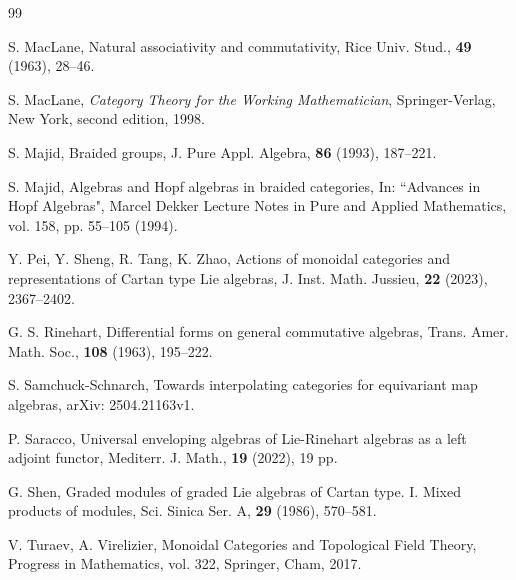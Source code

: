 \documentclass[11pt]{amsart}
\newcommand{\bbC}{\mathbb{C}}
\theoremstyle{definition}
\numberwithin{equation}{section}
\begin{document}
\begin{thebibliography}{99}
	
	
	 S. MacLane, Natural associativity and commutativity, Rice Univ. Stud., {\bf 49} (1963), 28--46.
	
	 S. MacLane,  \textit{Category Theory for the Working Mathematician},  Springer-Verlag, New York, second edition, 1998.
	
	 S. Majid, Braided groups, J. Pure Appl. Algebra, {\bf 86} (1993), 187--221.
	
	 S. Majid, Algebras and Hopf algebras in braided categories, In: ``Advances in Hopf Algebras", Marcel Dekker Lecture Notes in Pure and Applied Mathematics, vol. 158, pp. 55--105 (1994).
	
	 Y. Pei,  Y.  Sheng,  R. Tang, K.  Zhao,  Actions of monoidal categories and representations of Cartan type Lie algebras, 
	J. Inst. Math. Jussieu, {\bf 22}  (2023),  2367--2402.
	
	 G. S. Rinehart, Differential forms on general commutative algebras, Trans. Amer. Math. Soc., {\bf 108} (1963), 195--222.
	
	 S. Samchuck-Schnarch, Towards interpolating categories for equivariant map algebras, arXiv: 2504.21163v1. 
	
	 P. Saracco, Universal enveloping algebras of Lie-Rinehart algebras as a left adjoint functor, Mediterr. J. Math., {\bf 19} (2022), 19 pp. 
	
	 G. Shen, Graded modules of graded Lie algebras of Cartan type. I. Mixed products of modules, Sci. Sinica Ser. A, {\bf 29} (1986), 570--581. 
	
	
	 V. Turaev, A. Virelizier, Monoidal Categories and Topological Field Theory, Progress in Mathematics, vol. 322, Springer, Cham, 2017.
	
\end{thebibliography}
		
	
\end{document}
